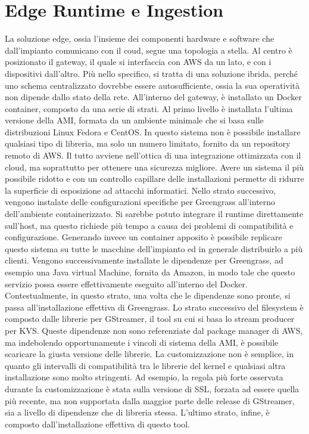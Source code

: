 \section{Edge Runtime e Ingestion}

La soluzione edge, ossia l'insieme dei componenti hardware e software che dall'impianto comunicano con il coud, segue una topologia a stella. Al centro è posizionato il gateway, il quale si interfaccia con AWS da un lato, e con i dispositivi dall'altro. Più nello specifico, si tratta di una soluzione ibrida, perché uno schema centralizzato dovrebbe essere autosufficiente, ossia la sua operatività non dipende dallo stato della rete. All'interno del gateway, è installato un Docker container, composto da una serie di strati. Al primo livello è installata l'ultima versione della AMI, formata da un ambiente minimale che si basa sulle distribuzioni Linux Fedora e CentOS. In questo sistema non è possibile installare qualsiasi tipo di libreria, ma solo un numero limitato, fornito da un repository remoto di AWS. Il tutto avviene nell'ottica di una integrazione ottimizzata con il cloud, ma soprattutto per ottenere una sicurezza migliore. Avere un sistema il più possibile ridotto e con un controllo capillare delle installazioni permette di ridurre la superficie di esposizione ad attacchi informatici. Nello strato successivo, vengono instalate delle configurazioni specifiche per Greengrass all'interno dell'ambiente containerizzato. Si sarebbe potuto integrare il runtime direttamente sull'host, ma questo richiede più tempo a causa dei problemi di compatibilità e configurazione. Generando invece un container apposito è possibile replicare questo sistema su tutte le macchine dell'impianto ed in generale distribuirlo a più clienti. Vengono successivamente installate le dipendenze per Greengrass, ad esempio una Java virtual Machine, fornita da Amazon, in modo tale che questo servizio possa essere effettivamente eseguito all'interno del Docker. Contestualmente, in questo strato, una volta che le dipendenze sono pronte, si passa all'installazione effettiva di Greengrass. Lo strato successivo del filesystem è composto dalle librerie per GStreamer, il tool su cui si basa lo stream producer per KVS. Queste dipendenze non sono referenziate dal package manager di AWS, ma indebolendo opportunamente i vincoli di sistema della AMI, è possibile scaricare la giusta versione delle librerie. La customizzazione non è semplice, in quanto gli intervalli di compatibilità tra le librerie del kernel e qualsiasi altra installazione sono molto stringenti. Ad esempio, la regola più forte osservata durante la customizzazione è stata sulla versione di SSL, forzata ad essere quella più recente, ma non supportata dalla maggior parte delle release di GStreamer, sia a livello di dipendenze che di libreria stessa. L'ultimo strato, infine, è composto dall'installazione effettiva di questo tool.







